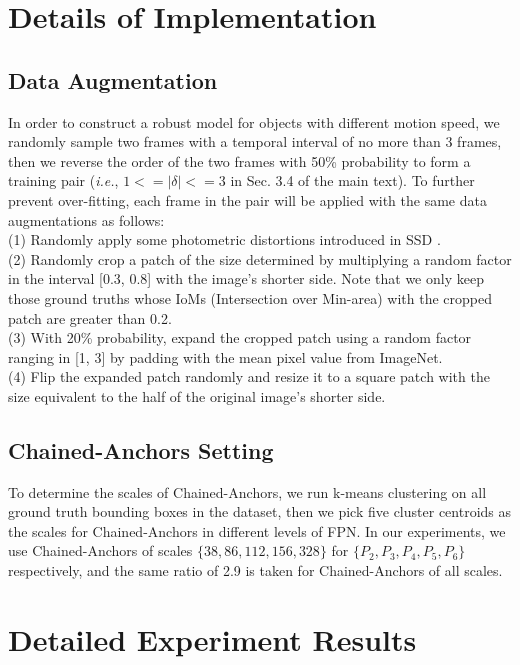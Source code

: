 \documentclass[crop=false]{standalone}
\begin{document}
\fi

\section{Details of Implementation}

\subsection{Data Augmentation\label{subsection:s_aug}}
In order to construct a robust model for objects with different motion speed, we randomly sample two frames with a temporal interval of no more than 3 frames, then we reverse the order of the two frames with 50\% probability to form a training pair (\textit{i.e.}, $1<=|\delta|<=3$ in Sec. 3.4 of the main text). To further prevent over-fitting, each frame in the pair will be applied with the same data augmentations as follows:\\
(1) Randomly apply some photometric distortions introduced in SSD \cite{liu2016ssd}.\\
(2) Randomly crop a patch of the size determined by multiplying a random factor in the interval [0.3, 0.8] with the image’s shorter side. Note that we only keep those ground truths whose IoMs (Intersection over Min-area) with the cropped patch are greater than 0.2.\\
(3) With 20\% probability, expand the cropped patch using a random factor ranging in [1, 3] by padding with the mean pixel value from ImageNet.\\
(4) Flip the expanded patch randomly and resize it to a square patch with the size equivalent to the half of the original image’s shorter side.

\subsection{Chained-Anchors Setting\label{subsection:s_anchor}}
To determine the scales of Chained-Anchors, we run k-means clustering \cite{yolov2} on all ground truth bounding boxes in the dataset, then we pick five cluster centroids as the scales for Chained-Anchors in different levels of FPN. In our experiments, we use Chained-Anchors of scales $\{38, 86, 112, 156, 328\}$ for $\{P_2, P_3, P_4, P_5, P_6\}$ respectively, and the same ratio of 2.9 is taken for Chained-Anchors of all scales.

\section{Detailed Experiment Results\label{section:s_exp}}
\end{document}
